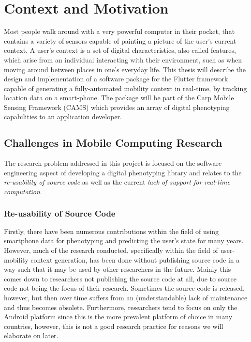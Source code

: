 \section{Context and Motivation}


Most people walk around with a very powerful computer in their pocket, that contains a variety of sensors capable of painting a picture of the user's current context. A user's context is a set of digital characteristics, also called features, which arise from an individual interacting with their environment, such as when moving around between places in one's everyday life. This thesis will describe the design and implementation of a software package for the Flutter framework capable of generating a fully-automated mobility context in real-time, by tracking location data on a smart-phone. The package will be part of the Carp Mobile Sensing Framework (CAMS) which provides an array of digital phenotyping capabilities to an application developer.\\

\subsection*{Challenges in Mobile Computing Research}
The research problem addressed in this project is focused on the software engineering aspect of developing a digital phenotyping library and relates to the \textit{re-usability of source code} as well as the current \textit{lack of support for real-time computation}.

\subsubsection*{Re-usability of Source Code}
Firstly, there have been numerous contributions within the field of using smartphone data for phenotyping and predicting the user's state for many years. However, much of the research conducted, specifically within the field of user-mobility context generation, has been done without publishing source code in a way such that it may be used by other researchers in the future. Mainly this comes down to researchers not publishing the source code at all, due to source code not being the focus of their research. Sometimes the source code is released, however, but then over time suffers from an (understandable) lack of maintenance and thus becomes obsolete. Furthermore, researchers tend to focus on only the Android platform since this is the more prevalent platform of choice in many countries, however, this is not a good research practice for reasons we will elaborate on later.

